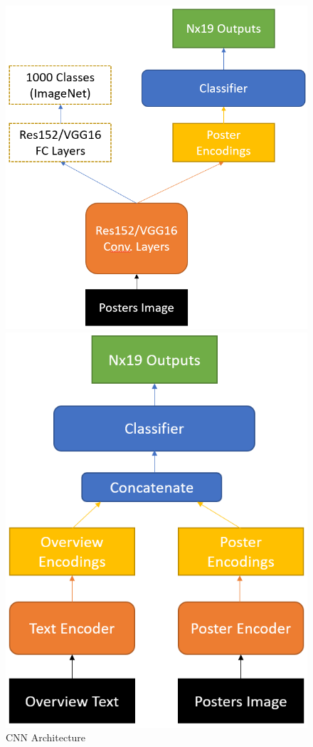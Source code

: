 \documentclass[12pt]{article} %
\begin{document}
\begin{figure}[H]
\begin{minipage}{0.37\textwidth}
  \includegraphics[width=\linewidth]{cnn.png}
  \caption{CNN Architecture}
  \label{fig:cnn}
\end{minipage}%
\begin{minipage}{0.31\textwidth}
  \centering
  \includegraphics[width=\linewidth]{combined_net.png}

\end{minipage}
\end{figure}
\end{document}
